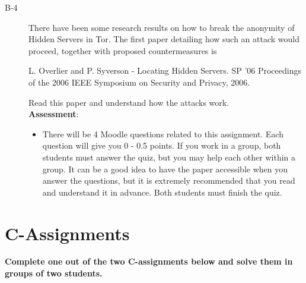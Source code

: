 \documentclass{article}
\begin{document}
\begin{description}
	\item[B-4]{There have been some research results on how to break the anonymity of Hidden Servers in Tor. The first paper detailing how such an attack would proceed, together with proposed countermeasures is 
		\begin{center}
		\begin{minipage}{0.8\textwidth}L. Overlier and P. Syverson - Locating Hidden Servers. SP '06 Proceedings of the 2006 IEEE Symposium on Security and Privacy, 2006.
		\end{minipage}
		\end{center}
		Read this paper and understand how the attacks work.\\
	\textbf{Assessment}:
	\begin{itemize}
		\item There will be 4 Moodle questions related to this assignment. Each question will give you 0 - 0.5 points. If you work in a group, both students must answer the quiz, but you may help each other within a group. It can be a good idea to have the paper accessible when you answer the questions, but it is extremely recommended that you read and understand it in advance. Both students must finish the quiz.
	\end{itemize}
	}

	

	
	
\end{description}

\clearpage

\section*{C-Assignments}
\textbf{Complete one out of the two C-assignments below and solve them in groups of two students.}
\end{document}
